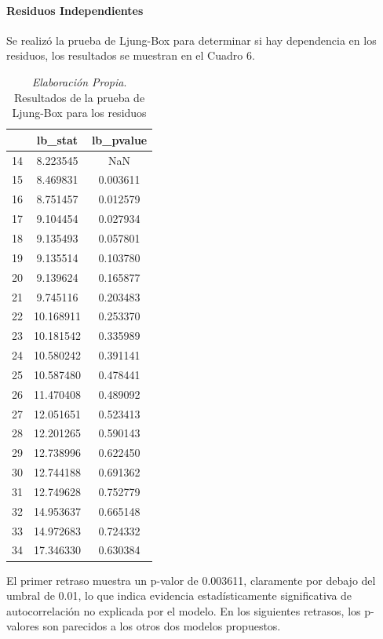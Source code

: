 \documentclass[12pt,letterpaper]{article}   %
\begin{document}
\paragraph{Residuos Independientes}
Se realizó la prueba de Ljung-Box para determinar si hay dependencia en los residuos, los resultados se muestran en el Cuadro 6.
\begin{table}[h!]
\footnotesize
\centering
\begin{tabular}{ccc}
\hline
\textbf{} & \textbf{lb\_stat} & \textbf{lb\_pvalue} \\
\hline
14 & 8.223545  & NaN \\
15 & 8.469831  & 0.003611 \\
16 & 8.751457  & 0.012579 \\
17 & 9.104454  & 0.027934 \\
18 & 9.135493  & 0.057801 \\
19 & 9.135514  & 0.103780 \\
20 & 9.139624  & 0.165877 \\
21 & 9.745116  & 0.203483 \\
22 & 10.168911 & 0.253370 \\
23 & 10.181542 & 0.335989 \\
24 & 10.580242 & 0.391141 \\
25 & 10.587480 & 0.478441 \\
26 & 11.470408 & 0.489092 \\
27 & 12.051651 & 0.523413 \\
28 & 12.201265 & 0.590143 \\
29 & 12.738996 & 0.622450 \\
30 & 12.744188 & 0.691362 \\
31 & 12.749628 & 0.752779 \\
32 & 14.953637 & 0.665148 \\
33 & 14.972683 & 0.724332 \\
34 & 17.346330 & 0.630384 \\
\hline
\end{tabular}
\caption{\textit{Elaboración Propia}. Resultados de la prueba de Ljung-Box para los residuos}
\end{table}

El primer retraso  muestra un p-valor de 0.003611, claramente por debajo del umbral de 0.01, lo que indica evidencia estadísticamente significativa de autocorrelación no explicada por el modelo. En los siguientes retrasos, los p-valores son parecidos a los otros dos modelos propuestos.
\end{document}
